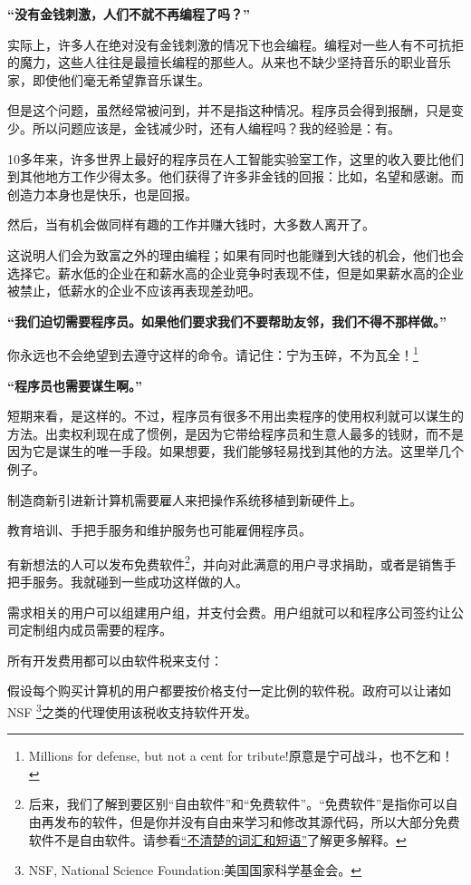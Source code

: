 \bf“没有金钱刺激，人们不就不再编程了吗？”\normalall\par
实际上，许多人在绝对没有金钱刺激的情况下也会编程。编程对一些人有不可抗拒的魔力，这些人往往是最擅长编程的那些人。从来也不缺少坚持音乐的职业音乐家，即使他们毫无希望靠音乐谋生。\par
但是这个问题，虽然经常被问到，并不是指这种情况。程序员会得到报酬，只是变少。所以问题应该是，金钱减少时，还有人编程吗？我的经验是：有。\par
10多年来，许多世界上最好的程序员在人工智能实验室工作，这里的收入要比他们到其他地方工作少得太多。他们获得了许多非金钱的回报：比如，名望和感谢。而创造力本身也是快乐，也是回报。\par
然后，当有机会做同样有趣的工作并赚大钱时，大多数人离开了。\par
这说明人们会为致富之外的理由编程；如果有同时也能赚到大钱的机会，他们也会选择它。薪水低的企业在和薪水高的企业竞争时表现不佳，但是如果薪水高的企业被禁止，低薪水的企业不应该再表现差劲吧。\par
\bf“我们迫切需要程序员。如果他们要求我们不要帮助友邻，我们不得不那样做。”\normalall\par
你永远也不会绝望到去遵守这样的命令。请记住：宁为玉碎，不为瓦全！\footnote{Millions for defense, but not a cent for tribute!原意是宁可战斗，也不乞和！}\par
\bf“程序员也需要谋生啊。”\normalall\par
短期来看，是这样的。不过，程序员有很多不用出卖程序的使用权利就可以谋生的方法。出卖权利现在成了惯例，是因为它带给程序员和生意人最多的钱财，而不是因为它是谋生的唯一手段。如果想要，我们能够轻易找到其他的方法。这里举几个例子。\par
制造商新引进新计算机需要雇人来把操作系统移植到新硬件上。\par
教育培训、手把手服务和维护服务也可能雇佣程序员。\par
有新想法的人可以发布免费软件\footnote{后来，我们了解到要区别“自由软件”和“免费软件”。“免费软件”是指你可以自由再发布的软件，但是你并没有自由来学习和修改其源代码，所以大部分免费软件不是自由软件。请参看\href{http://www.gnu.org/philosophy/words-to-avoid.html \# GiveAwaySoftware}{“不清楚的词汇和短语”}了解更多解释。}，并向对此满意的用户寻求捐助，或者是销售手把手服务。我就碰到一些成功这样做的人。\par
需求相关的用户可以组建用户组，并支付会费。用户组就可以和程序公司签约让公司定制组内成员需要的程序。\par
所有开发费用都可以由软件税来支付：\par
假设每个购买计算机的用户都要按价格支付一定比例的软件税。政府可以让诸如NSF \footnote{NSF, National Science Foundation:美国国家科学基金会。}之类的代理使用该税收支持软件开发。\par
